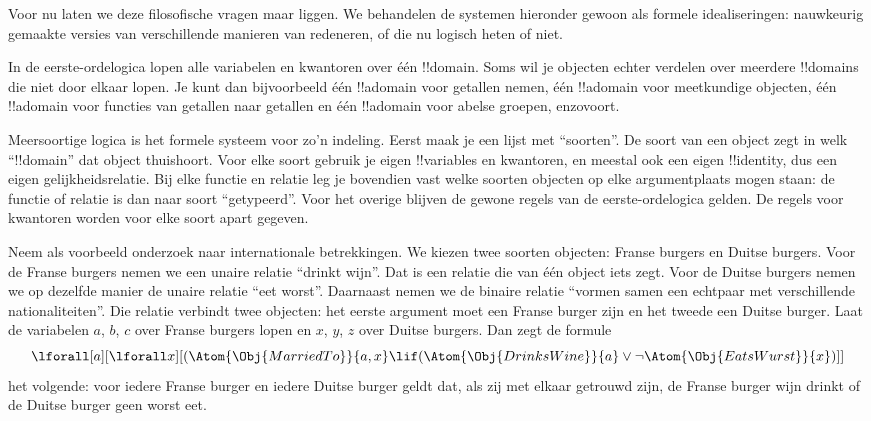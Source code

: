 \documentclass[openany]{memoir}
\begin{document}
Voor nu laten we deze filosofische vragen maar liggen. We behandelen de
systemen hieronder gewoon als formele idealiseringen: nauwkeurig
gemaakte versies van verschillende manieren van redeneren, of die nu
logisch heten of niet.
\endgroup

\begingroup
\def\olfilename{OLP-0176}
\def\olfilepath{content/first-order-logic/beyond/}
\hypertarget{unit-OLP-0176}{}





In de eerste-ordelogica lopen alle variabelen en kwantoren over één
!!{domain}. Soms wil je objecten echter verdelen over meerdere
!!{domain}s die niet door elkaar lopen. Je kunt dan bijvoorbeeld één
!!a{domain} voor getallen nemen, één !!a{domain} voor meetkundige
objecten, één !!a{domain} voor functies van getallen naar getallen en
één !!a{domain} voor abelse groepen, enzovoort.

Meersoortige logica is het formele systeem voor zo'n indeling. Eerst
maak je een lijst met ``soorten''. De soort van een object zegt in welk
``!!{domain}'' dat object thuishoort. Voor elke soort gebruik je eigen
!!{variable}s en kwantoren, en meestal ook een eigen !!{identity}, dus
een eigen gelijkheidsrelatie. Bij elke functie en relatie leg je
bovendien vast welke soorten objecten op elke argumentplaats mogen
staan: de functie of relatie is dan naar soort ``getypeerd''. Voor het
overige blijven de gewone regels van de eerste-ordelogica gelden. De
regels voor kwantoren worden voor elke soort apart gegeven.

Neem als voorbeeld onderzoek naar internationale betrekkingen. We
kiezen twee soorten objecten: Franse burgers en Duitse burgers. Voor
de Franse burgers nemen we een unaire relatie ``drinkt wijn''. Dat is
een relatie die van één object iets zegt. Voor de Duitse burgers nemen
we op dezelfde manier de unaire relatie ``eet worst''. Daarnaast nemen
we de binaire relatie ``vormen samen een echtpaar met verschillende
nationaliteiten''. Die relatie verbindt twee objecten: het eerste
argument moet een Franse burger zijn en het tweede een Duitse burger.
Laat de variabelen $a$, $b$, $c$ over Franse burgers lopen en $x$, $y$, $z$
over Duitse burgers. Dan zegt de formule
\[
\lforall[a][\lforall x][(\Atom{\Obj{MarriedTo}}{a,x} \lif
(\Atom{\Obj{DrinksWine}}{a} \lor \lnot \Atom{\Obj{EatsWurst}}{x})]]
\]
het volgende: voor iedere Franse burger en iedere Duitse burger geldt
dat, als zij met elkaar getrouwd zijn, de Franse burger wijn drinkt of
de Duitse burger geen worst eet.
\end{document}

